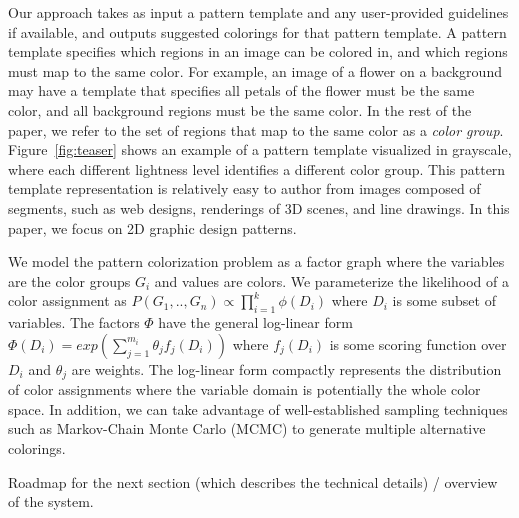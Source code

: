 Our approach takes as input a pattern template and any user-provided guidelines if available, and outputs suggested colorings for that pattern template. A pattern template specifies which regions in an image can be colored in, and which regions must map to the same color. For example, an image of a flower on a background may have a template that specifies all petals of the flower must be the same color, and all background regions must be the same color. In the rest of the paper, we refer to the set of regions that map to the same color as a \emph{color group}. Figure~\ref{fig:teaser} shows an example of a pattern template visualized in grayscale, where each different lightness level identifies a different color group. This pattern template representation is relatively easy to author from images composed of segments, such as web designs, renderings of 3D scenes, and line drawings. In this paper, we focus on 2D graphic design patterns. 




We model the pattern colorization problem as a factor graph where the variables are the color groups $G_i$ and values are colors. We parameterize the likelihood of a color assignment as $P(G_1,..,G_n) \propto \prod_{i=1}^{k} \phi(D_i)$ where $D_i$ is some subset of variables. The factors $\Phi$ have the general log-linear form $\Phi(D_i) = exp(\sum_{j=1}^{m_i} \theta_j f_j(D_i))$ where $f_j(D_i)$ is some scoring function over $D_i$ and $\theta_j$ are weights. The log-linear form compactly represents the distribution of color assignments where the variable domain is potentially the whole color space. In addition, we can take advantage of well-established sampling techniques such as Markov-Chain Monte Carlo (MCMC) to generate multiple alternative colorings.



Roadmap for the next section (which describes the technical details) / overview of the system.